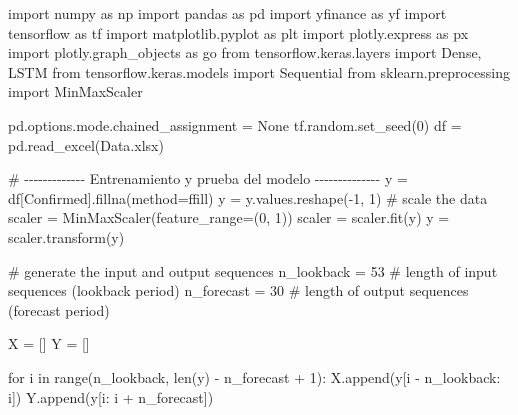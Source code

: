 \documentclass[
  us-letterpaper,
]{scrreprt}
\newenvironment{Shaded}{\begin{snugshade}}{\end{snugshade}}
\newcommand{\BuiltInTok}[1]{\textcolor[rgb]{0.00,0.23,0.31}{#1}}
\newcommand{\CommentTok}[1]{\textcolor[rgb]{0.37,0.37,0.37}{#1}}
\newcommand{\ControlFlowTok}[1]{\textcolor[rgb]{0.00,0.23,0.31}{#1}}
\newcommand{\DecValTok}[1]{\textcolor[rgb]{0.68,0.00,0.00}{#1}}
\newcommand{\ImportTok}[1]{\textcolor[rgb]{0.00,0.46,0.62}{#1}}
\newcommand{\KeywordTok}[1]{\textcolor[rgb]{0.00,0.23,0.31}{#1}}
\newcommand{\NormalTok}[1]{\textcolor[rgb]{0.00,0.23,0.31}{#1}}
\newcommand{\OperatorTok}[1]{\textcolor[rgb]{0.37,0.37,0.37}{#1}}
\newcommand{\StringTok}[1]{\textcolor[rgb]{0.13,0.47,0.30}{#1}}
\newcommand{\VariableTok}[1]{\textcolor[rgb]{0.07,0.07,0.07}{#1}}
\theoremstyle{definition}
\theoremstyle{plain}
\theoremstyle{plain}
\theoremstyle{definition}
\theoremstyle{remark}
\begin{document}
\begin{Shaded}
\begin{Highlighting}[]
\ImportTok{import}\NormalTok{ numpy }\ImportTok{as}\NormalTok{ np}
\ImportTok{import}\NormalTok{ pandas }\ImportTok{as}\NormalTok{ pd}
\ImportTok{import}\NormalTok{ yfinance }\ImportTok{as}\NormalTok{ yf}
\ImportTok{import}\NormalTok{ tensorflow }\ImportTok{as}\NormalTok{ tf}
\ImportTok{import}\NormalTok{ matplotlib.pyplot }\ImportTok{as}\NormalTok{ plt}
\ImportTok{import}\NormalTok{ plotly.express }\ImportTok{as}\NormalTok{ px}
\ImportTok{import}\NormalTok{ plotly.graph\_objects }\ImportTok{as}\NormalTok{ go}
\ImportTok{from}\NormalTok{ tensorflow.keras.layers }\ImportTok{import}\NormalTok{ Dense, LSTM}
\ImportTok{from}\NormalTok{ tensorflow.keras.models }\ImportTok{import}\NormalTok{ Sequential}
\ImportTok{from}\NormalTok{ sklearn.preprocessing }\ImportTok{import}\NormalTok{ MinMaxScaler}

\NormalTok{pd.options.mode.chained\_assignment }\OperatorTok{=} \VariableTok{None}
\NormalTok{tf.random.set\_seed(}\DecValTok{0}\NormalTok{)}
\NormalTok{df }\OperatorTok{=}\NormalTok{ pd.read\_excel(}\StringTok{\textquotesingle{}Data.xlsx\textquotesingle{}}\NormalTok{)}

\CommentTok{\# {-}{-}{-}{-}{-}{-}{-}{-}{-}{-}{-}{-}{-} Entrenamiento y prueba del modelo {-}{-}{-}{-}{-}{-}{-}{-}{-}{-}{-}{-}{-}{-}}
\NormalTok{y }\OperatorTok{=}\NormalTok{ df[}\StringTok{\textquotesingle{}Confirmed\textquotesingle{}}\NormalTok{].fillna(method}\OperatorTok{=}\StringTok{\textquotesingle{}ffill\textquotesingle{}}\NormalTok{)}
\NormalTok{y }\OperatorTok{=}\NormalTok{ y.values.reshape(}\OperatorTok{{-}}\DecValTok{1}\NormalTok{, }\DecValTok{1}\NormalTok{)}
\CommentTok{\# scale the data}
\NormalTok{scaler }\OperatorTok{=}\NormalTok{ MinMaxScaler(feature\_range}\OperatorTok{=}\NormalTok{(}\DecValTok{0}\NormalTok{, }\DecValTok{1}\NormalTok{))}
\NormalTok{scaler }\OperatorTok{=}\NormalTok{ scaler.fit(y)}
\NormalTok{y }\OperatorTok{=}\NormalTok{ scaler.transform(y)}

\CommentTok{\# generate the input and output sequences}
\NormalTok{n\_lookback }\OperatorTok{=} \DecValTok{53}  \CommentTok{\# length of input sequences (lookback period)}
\NormalTok{n\_forecast }\OperatorTok{=} \DecValTok{30}  \CommentTok{\# length of output sequences (forecast period)}

\NormalTok{X }\OperatorTok{=}\NormalTok{ []}
\NormalTok{Y }\OperatorTok{=}\NormalTok{ []}

\ControlFlowTok{for}\NormalTok{ i }\KeywordTok{in} \BuiltInTok{range}\NormalTok{(n\_lookback, }\BuiltInTok{len}\NormalTok{(y) }\OperatorTok{{-}}\NormalTok{ n\_forecast }\OperatorTok{+} \DecValTok{1}\NormalTok{):}
\NormalTok{    X.append(y[i }\OperatorTok{{-}}\NormalTok{ n\_lookback: i])}
\NormalTok{    Y.append(y[i: i }\OperatorTok{+}\NormalTok{ n\_forecast])}


\end{Highlighting}
\end{Shaded}
\end{document}
